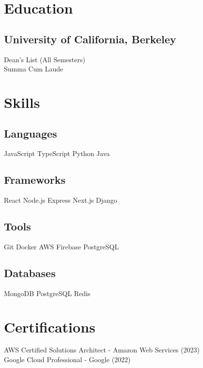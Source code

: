 \documentclass[]{deedy-resume-reversed}
\begin{document}
\hfill
\begin{minipage}[t]{0.33\textwidth}

\section{Education}

\subsection{University of California, Berkeley}
Dean's List (All Semesters) \\
Summa Cum Laude \\
\sectionsep


\section{Skills}
\subsection{Languages}
JavaScript \textbullet{} TypeScript \textbullet{} Python \textbullet{} Java \\
\sectionsep

\subsection{Frameworks}
React \textbullet{} Node.js \textbullet{} Express \textbullet{} Next.js \textbullet{} Django \\
\sectionsep

\subsection{Tools}
Git \textbullet{} Docker \textbullet{} AWS \textbullet{} Firebase \textbullet{} PostgreSQL \\
\sectionsep

\subsection{Databases}
MongoDB \textbullet{} PostgreSQL \textbullet{} Redis \\
\sectionsep


\section{Certifications}
AWS Certified Solutions Architect - Amazon Web Services (2023) \\
Google Cloud Professional - Google (2022) \\
\sectionsep


\end{minipage}
\end{document}
